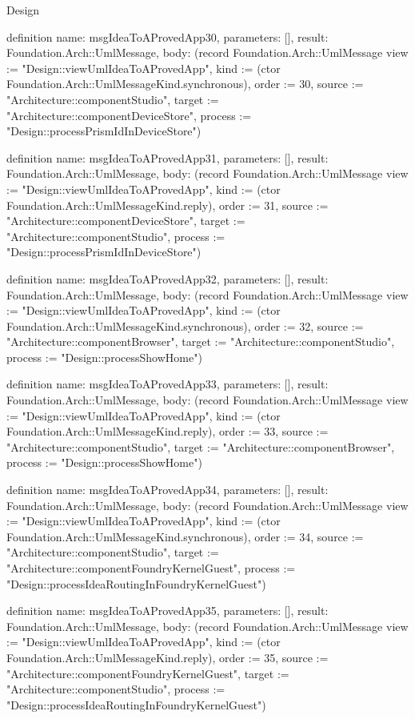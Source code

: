 \begin{lexlean}{Design}
\begin{semanticmodule}
definition{
  name: msgIdeaToAProvedApp30,
  parameters: [],
  result: Foundation.Arch::UmlMessage,
  body: (record Foundation.Arch::UmlMessage {view := "Design::viewUmlIdeaToAProvedApp", kind := (ctor Foundation.Arch::UmlMessageKind.synchronous), order := 30, source := "Architecture::componentStudio", target := "Architecture::componentDeviceStore", process := "Design::processPrismIdInDeviceStore"})
}

definition{
  name: msgIdeaToAProvedApp31,
  parameters: [],
  result: Foundation.Arch::UmlMessage,
  body: (record Foundation.Arch::UmlMessage {view := "Design::viewUmlIdeaToAProvedApp", kind := (ctor Foundation.Arch::UmlMessageKind.reply), order := 31, source := "Architecture::componentDeviceStore", target := "Architecture::componentStudio", process := "Design::processPrismIdInDeviceStore"})
}

definition{
  name: msgIdeaToAProvedApp32,
  parameters: [],
  result: Foundation.Arch::UmlMessage,
  body: (record Foundation.Arch::UmlMessage {view := "Design::viewUmlIdeaToAProvedApp", kind := (ctor Foundation.Arch::UmlMessageKind.synchronous), order := 32, source := "Architecture::componentBrowser", target := "Architecture::componentStudio", process := "Design::processShowHome"})
}

definition{
  name: msgIdeaToAProvedApp33,
  parameters: [],
  result: Foundation.Arch::UmlMessage,
  body: (record Foundation.Arch::UmlMessage {view := "Design::viewUmlIdeaToAProvedApp", kind := (ctor Foundation.Arch::UmlMessageKind.reply), order := 33, source := "Architecture::componentStudio", target := "Architecture::componentBrowser", process := "Design::processShowHome"})
}

definition{
  name: msgIdeaToAProvedApp34,
  parameters: [],
  result: Foundation.Arch::UmlMessage,
  body: (record Foundation.Arch::UmlMessage {view := "Design::viewUmlIdeaToAProvedApp", kind := (ctor Foundation.Arch::UmlMessageKind.synchronous), order := 34, source := "Architecture::componentStudio", target := "Architecture::componentFoundryKernelGuest", process := "Design::processIdeaRoutingInFoundryKernelGuest"})
}

definition{
  name: msgIdeaToAProvedApp35,
  parameters: [],
  result: Foundation.Arch::UmlMessage,
  body: (record Foundation.Arch::UmlMessage {view := "Design::viewUmlIdeaToAProvedApp", kind := (ctor Foundation.Arch::UmlMessageKind.reply), order := 35, source := "Architecture::componentFoundryKernelGuest", target := "Architecture::componentStudio", process := "Design::processIdeaRoutingInFoundryKernelGuest"})
}


\end{semanticmodule}
\end{lexlean}
